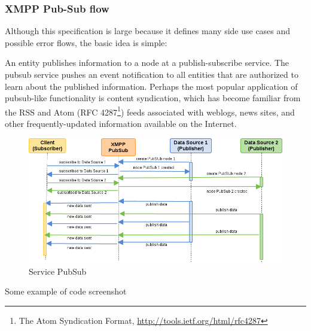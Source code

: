 	\subsubsection{XMPP Pub-Sub flow}
	Although this specification is large because it defines many side use cases and possible error flows, the basic idea is simple:

	An entity publishes information to a node at a publish-subscribe service. The pubsub service pushes an event notification to all entities that are authorized to learn about the published information. Perhaps the most popular application of pubsub-like functionality is content syndication, which has become familiar from the RSS and Atom (RFC 4287\footnote{The Atom Syndication Format, \url{http://tools.ietf.org/html/rfc4287}}) feeds associated with weblogs, news sites, and other frequently-updated information available on the Internet. 
    \begin{figure}[!ht]
    \centering
    \includegraphics[scale=0.6]{images/PubSub.png}   
    \caption[Service PubSub]{Service PubSub}
    \label{img:pub_sub}                           
    \end{figure}

	Some example of code screenshot

